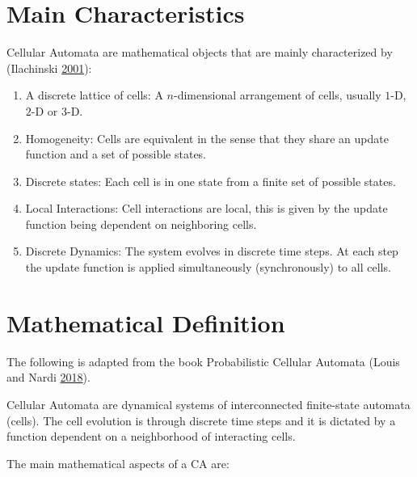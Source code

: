 \documentclass[
  12pt,
  openany]{book}
\begin{document}
\hypertarget{main-characteristics}{%
\section{Main Characteristics}\label{main-characteristics}}

Cellular Automata are mathematical objects that are mainly characterized by (Ilachinski \protect\hyperlink{ref-ilachinski2001cellular}{2001}):

\begin{enumerate}
\def\labelenumi{\arabic{enumi}.}
\item
  A discrete lattice of cells:
  A \(n\)-dimensional arrangement of cells, usually \(1\)-D, \(2\)-D or \(3\)-D.
\item
  Homogeneity:
  Cells are equivalent in the sense that they share an update function and a set of possible states.
\item
  Discrete states:
  Each cell is in one state from a finite set of possible states.
\item
  Local Interactions:
  Cell interactions are local, this is given by the update function being dependent on neighboring cells.
\item
  Discrete Dynamics:
  The system evolves in discrete time steps. At each step the update function is applied simultaneously (synchronously) to all cells.
\end{enumerate}

\hypertarget{mathematical-definition}{%
\section{Mathematical Definition}\label{mathematical-definition}}

The following is adapted from the book Probabilistic Cellular Automata (Louis and Nardi \protect\hyperlink{ref-louis2018probabilistic}{2018}).

Cellular Automata are dynamical systems of interconnected finite-state automata (cells). The cell evolution is through discrete time steps and it is dictated by a function dependent on a neighborhood of interacting cells.

The main mathematical aspects of a CA are:
\end{document}
